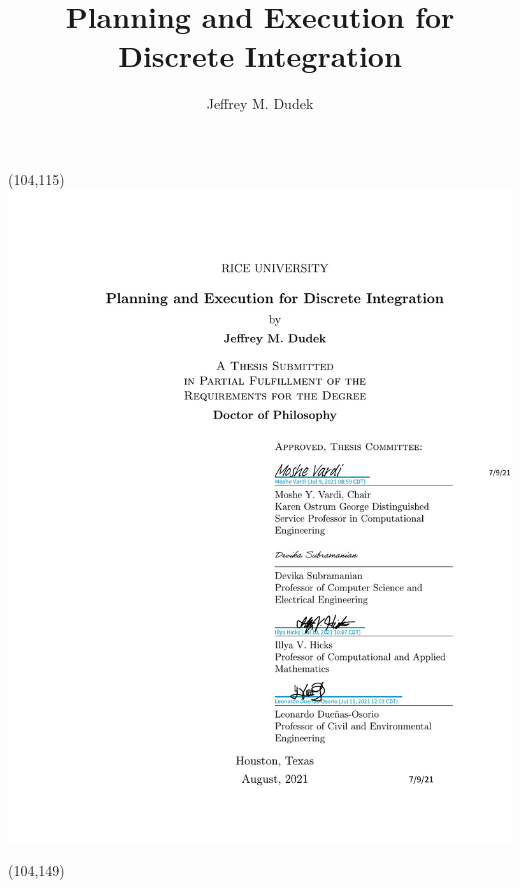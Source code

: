 \documentclass[12pt]{sty/ruthesis}
\title{Planning and Execution for Discrete Integration}
\author{Jeffrey M. Dudek}
\begin{document}
  \begin{frontmatter}
   
   \begin{textblock}{80}(104,115)
   	\includegraphics[page=1,clip,trim=110mm 152.8mm 10mm 115mm]{coverpage.pdf}
   \end{textblock}
   \begin{textblock}{80}(104,149)

\end{textblock}
\end{frontmatter}
\end{document}
